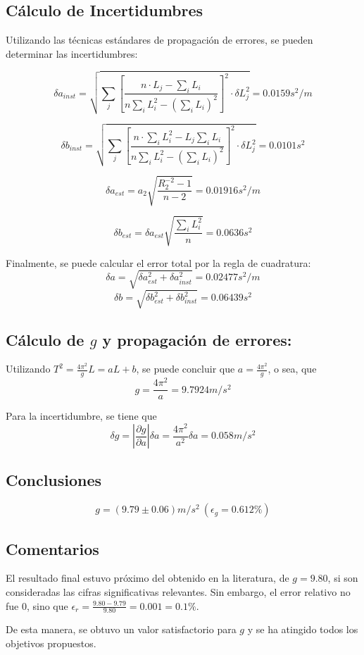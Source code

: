 \documentclass[a4paper,12pt]{article}
\begin{document}
\subsection{Cálculo de Incertidumbres}

Utilizando las técnicas estándares de propagación de errores, se pueden determinar las 
incertidumbres:

  $$\delta a_{inst} = \sqrt{\sum_j\left[ \frac{n\cdot L _j - \sum_i L _i}{n\sum_i  L _i^2-\left(  \sum_i   L _i\right)^2} \right]^2 \cdot \delta  L _j^2} = 0.0159 s^2/m$$ 

  $$\delta b_{inst} =\sqrt{\sum_j\left[ \frac{n\cdot \sum _iL _i^2 - L _j \sum_i  L _i}{n\sum_i  L _i^2-\left(  \sum_i   L _i\right)^2} \right]^2 \cdot \delta  L _j^2} = 0.0101 s^2$$

  $$\delta a_{est }= a_2\sqrt{\frac{R_2^{-2}-1}{n-2}} = 0.01916 s^2/m$$
  
  $$\delta b_{est} = \delta a_{est}\sqrt{\frac{\sum_i L _i^2}{n}} = 0.0636 s^2$$

Finalmente, se puede calcular el error total por la regla de cuadratura:
$$\delta a = \sqrt{\delta a_{est}^2 + \delta a_{inst}^2} = 0.02477 s^2/m$$
$$\delta b = \sqrt{\delta b_{est}^2 + \delta b_{inst}^2} = 0.06439 s^2$$

\subsection{Cálculo de $g$ y propagación de errores:}
Utilizando $T^2 = \frac{4\pi^2}{g} L = a L + b$, se puede concluir que $a = \frac{4\pi^2}{g}$, o sea, que
$$g = \frac{4\pi^2}{a} = 9.7924 m/s^2$$

Para la incertidumbre, se tiene que 
$$\delta g = |\frac{\partial g}{\partial a}| \delta a = \frac{4\pi^2}{a^2} \delta a = 0.058 m/s^2$$

\subsection{Conclusiones}

\begin{tcolorbox}
  \begin{equation}
    g = (9.79 \pm 0.06) m/s^2 \ (\epsilon_g=0.612\%)
\end{equation}
\end{tcolorbox}

\subsection{Comentarios}
El resultado final estuvo próximo del obtenido en la literatura, de $g = 9.80$, si son consideradas
las cifras significativas relevantes. Sin embargo, el error relativo no fue 0, sino que $\epsilon_r= \frac{9.80-9.79}{9.80} = 0.001 = 0.1\%$. 

De esta manera, se obtuvo un valor satisfactorio para $g$ y se ha atingido todos los objetivos propuestos.
\printbibliography
\end{document}
